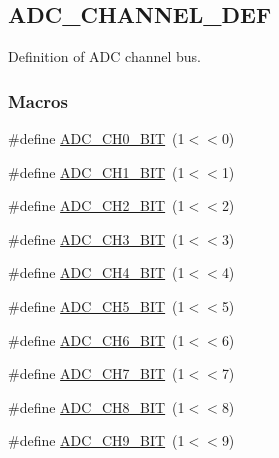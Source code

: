 \hypertarget{group___a_d_c___c_h_a_n_n_e_l___d_e_f}{}\subsection{A\+D\+C\+\_\+\+C\+H\+A\+N\+N\+E\+L\+\_\+\+D\+EF}
\label{group___a_d_c___c_h_a_n_n_e_l___d_e_f}


Definition of A\+DC channel bus.  


\subsubsection*{Macros}
\begin{DoxyCompactItemize}
\item 
\#define \hyperlink{group___a_d_c___c_h_a_n_n_e_l___d_e_f_ga0b7dad5dbe436841b0637f0fe7a62587}{A\+D\+C\+\_\+\+C\+H0\+\_\+\+B\+IT}~(1$<$$<$0)
\item 
\#define \hyperlink{group___a_d_c___c_h_a_n_n_e_l___d_e_f_gab0a30fdba89c495989ad144410eebf9c}{A\+D\+C\+\_\+\+C\+H1\+\_\+\+B\+IT}~(1$<$$<$1)
\item 
\#define \hyperlink{group___a_d_c___c_h_a_n_n_e_l___d_e_f_ga790d9599ab48a8096f6488d54491ade7}{A\+D\+C\+\_\+\+C\+H2\+\_\+\+B\+IT}~(1$<$$<$2)
\item 
\#define \hyperlink{group___a_d_c___c_h_a_n_n_e_l___d_e_f_ga05f1a08443935b4bd4cd1861c88eca45}{A\+D\+C\+\_\+\+C\+H3\+\_\+\+B\+IT}~(1$<$$<$3)
\item 
\#define \hyperlink{group___a_d_c___c_h_a_n_n_e_l___d_e_f_ga27538415c975ba23881e88cbd78d1660}{A\+D\+C\+\_\+\+C\+H4\+\_\+\+B\+IT}~(1$<$$<$4)
\item 
\#define \hyperlink{group___a_d_c___c_h_a_n_n_e_l___d_e_f_ga3f603c539f7affa4c46d3fef6c6e2bd6}{A\+D\+C\+\_\+\+C\+H5\+\_\+\+B\+IT}~(1$<$$<$5)
\item 
\#define \hyperlink{group___a_d_c___c_h_a_n_n_e_l___d_e_f_ga7fdf241df26f276c24cf2b53452d2f5d}{A\+D\+C\+\_\+\+C\+H6\+\_\+\+B\+IT}~(1$<$$<$6)
\item 
\#define \hyperlink{group___a_d_c___c_h_a_n_n_e_l___d_e_f_ga2321b1fa822ad43f380fc5c5ad3a7262}{A\+D\+C\+\_\+\+C\+H7\+\_\+\+B\+IT}~(1$<$$<$7)
\item 
\#define \hyperlink{group___a_d_c___c_h_a_n_n_e_l___d_e_f_ga77c2cd0f1178c2d908b3528807cf9ade}{A\+D\+C\+\_\+\+C\+H8\+\_\+\+B\+IT}~(1$<$$<$8)
\item 
\#define \hyperlink{group___a_d_c___c_h_a_n_n_e_l___d_e_f_ga641918bff766593f35b1eb05135beed7}{A\+D\+C\+\_\+\+C\+H9\+\_\+\+B\+IT}~(1$<$$<$9)

\end{DoxyCompactItemize}
